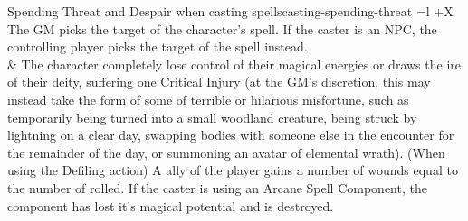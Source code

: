 \begin{table}[!htb]
\begin{GenesysTable}{Spending Threat and Despair when casting spells}{casting-spending-threat}{ =l +X}
                                        \newline
                                        The GM picks the target of the character's spell. If the caster is an NPC, the controlling player picks the target of the spell instead.\\
\despair\despair                    &   The character completely lose control of their magical energies or draws the ire of their deity, suffering one Critical Injury (at the GM's
                                        discretion, this may instead take the form of some of terrible or hilarious misfortune, such as temporarily being turned into a small woodland
                                        creature, being struck by lightning on a clear day, swapping bodies with someone else in the encounter for the remainder of the day, or
                                        summoning an avatar of elemental wrath).\newline
                                        \newline
                                        (When using the Defiling action) A ally of the player gains a number of wounds equal to the number of \threat rolled.\newline
                                        \newline
                                        If the caster is using an Arcane Spell Component, the component has lost it's magical potential and is destroyed.\\
\end{GenesysTable}
\end{table}

\FloatBarrier

